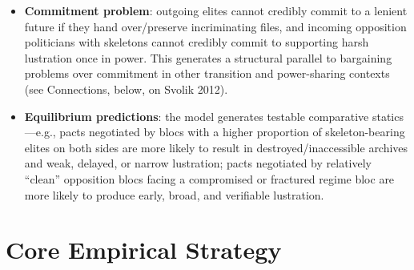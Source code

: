\documentclass[12pt]{article}
\begin{document}
\begin{itemize}[leftmargin=*, itemsep=4pt]
    \item \textbf{Commitment problem}: outgoing elites cannot credibly commit to a lenient future if they hand over/preserve incriminating files, and incoming opposition politicians with skeletons cannot credibly commit to supporting harsh lustration once in power. This generates a structural parallel to bargaining problems over commitment in other transition and power-sharing contexts (see Connections, below, on Svolik 2012).
    \item \textbf{Equilibrium predictions}: the model generates testable comparative statics---e.g., pacts negotiated by blocs with a higher proportion of skeleton-bearing elites on both sides are more likely to result in destroyed/inaccessible archives and weak, delayed, or narrow lustration; pacts negotiated by relatively ``clean'' opposition blocs facing a compromised or fractured regime bloc are more likely to produce early, broad, and verifiable lustration.
\end{itemize}

\section{Core Empirical Strategy}
\end{document}
